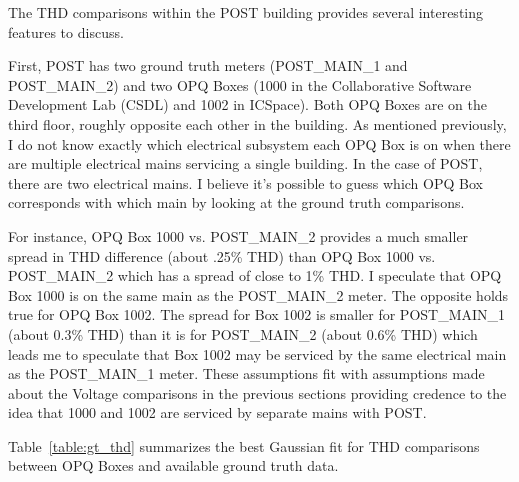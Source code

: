 The THD comparisons within the POST building provides several interesting features to discuss.

First, POST has two ground truth meters (POST\_MAIN\_1 and POST\_MAIN\_2) and two OPQ Boxes (1000 in the Collaborative Software Development Lab (CSDL) and 1002 in ICSpace). Both OPQ Boxes are on the third floor, roughly opposite each other in the building. As mentioned previously, I do not know exactly which electrical subsystem each OPQ Box is on when there are multiple electrical mains servicing a single building. In the case of POST, there are two electrical mains. I believe it's possible to guess which OPQ Box corresponds with which main by looking at the ground truth comparisons.

For instance, OPQ Box 1000 vs. POST\_MAIN\_2 provides a much smaller spread in THD difference (about .25\% THD) than OPQ Box 1000 vs. POST\_MAIN\_2 which has a spread of close to 1\% THD. I speculate that OPQ Box 1000 is on the same main as the POST\_MAIN\_2 meter. The opposite holds true for OPQ Box 1002. The spread for Box 1002 is smaller for POST\_MAIN\_1 (about 0.3\% THD) than it is for POST\_MAIN\_2 (about 0.6\% THD) which leads me to speculate that Box 1002 may be serviced by the same electrical main as the POST\_MAIN\_1 meter. These assumptions fit with assumptions made about the Voltage comparisons in the previous sections providing credence to the idea that 1000 and 1002 are serviced by separate mains with POST.

Table~\ref{table:gt_thd} summarizes the best Gaussian fit for THD comparisons between OPQ Boxes and available ground truth data.

